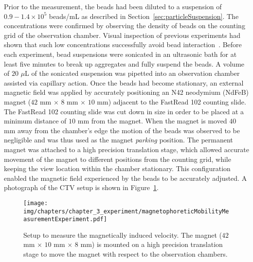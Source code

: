 Prior to the measurement, the beads had been diluted to a suspension of $0.9-1.4\times 10^{5}$ beads/mL as described in Section~\ref{sec:particleSuspension}. The concentrations were confirmed by observing the density of beads on the counting grid of the observation chamber. Visual inspection of previous experiments had shown that such low concentrations successfully avoid bead interaction~\cite{Oduwole2016}. Before each experiment, bead suspensions were sonicated in an ultrasonic bath for at least five minutes to break up aggregates and fully suspend the beads. A volume of $20$ $\mu$L of the sonicated suspension was pipetted into an observation chamber assisted via capillary action. Once the beads had become stationary, an external magnetic field was applied by accurately positioning an N42 neodymium (NdFeB) magnet ($42$ mm $\times$ $8$ mm $\times$ $10$ mm) adjacent to the FastRead 102 counting slide. The FastRead 102 counting slide was cut down in size in order to be placed at a minimum distance of $10$ mm from the magnet. When the magnet is moved $40$ mm away from the chamber's edge the motion of the beads was observed to be negligible and was thus used as the 	magnet \textit{parking} position. The permanent magnet was attached to a high precision translation stage, which allowed accurate movement of the magnet to different positions from the counting grid, while keeping the view location within the chamber stationary. This configuration enabled the magnetic field experienced by the beads to be accurately adjusted. A photograph of the CTV setup is shown in Figure~\ref{fig:magnetophoreticMobilityExperiment}.

\begin{figure}[htb]
	\centering
   \texttt{[image: img/chapters/chapter\_3\_experiment/magnetophoreticMobilityMeasurementExperiment.pdf]}
	\caption[Magnetophoretic velocity measurement experiment setup]{Setup to measure the magnetically induced velocity. The magnet ($42$ mm $\times$ $10$ mm $\times$ $8$ mm) is mounted on a high precision translation stage to move the magnet with respect to the observation chambers.}
\label{fig:magnetophoreticMobilityExperiment}
\end{figure}

